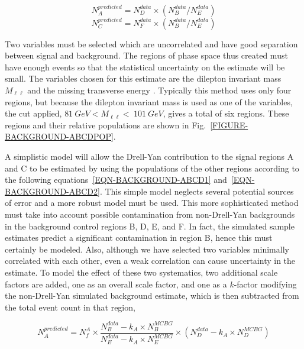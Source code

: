 \begin{equation}
\label{EQN-BACKGROUND-ABCD1}
N_{A}^{predicted} = N_{D}^{data} \times (N_{B}^{data}/N_{E}^{data})
\end{equation} 
\begin{equation}
\label{EQN-BACKGROUND-ABCD2}
N_{C}^{predicted} = N_{F}^{data} \times (N_{B}^{data}/N_{E}^{data})
\end{equation} 

Two variables must be selected which are uncorrelated and have good separation between signal and background. The regions of phase space thus created must have enough events so that the statistical uncertainty on the estimate will be small. The variables chosen for this estimate are the dilepton invariant mass $M_{\ell\ell}$ and the missing transverse energy \MET. Typically this method uses only four regions, but because the dilepton invariant mass is used as one of the variables, the cut applied, $81\ GeV < M_{\ell\ell} <\ 101\ GeV$, gives a total of six regions. These regions and their relative populations are shown in Fig.~\ref{FIGURE-BACKGROUND-ABCDPOP}.

A simplistic model will allow the Drell-Yan contribution to the signal regions A and C to be estimated by using the populations of the other regions according to the following equations~\ref{EQN-BACKGROUND-ABCD1} and~\ref{EQN-BACKGROUND-ABCD2}. This simple model neglects several potential sources of error and a more robust model must be used. This more sophisticated method must take into account possible contamination from non-Drell-Yan backgrounds in the background control regions B, D, E, and F. In fact, the simulated sample estimates predict a significant contamination in region B, hence this must certainly be modeled. Also, although we have selected two variables minimally correlated with each other, even a weak correlation can cause uncertainty in the estimate. To model the effect of these two systematics, two additional scale factors are added, one as an overall scale factor, and one as a $k$-factor modifying the non-Drell-Yan simulated background estimate, which is then subtracted from the total event count in that region,

\begin{equation}
N_{A}^{predicted} = N_{f}^{A} \times \frac{N_{B}^{data}-k_{A}\times N_{B}^{MCBG}}{N_{E}^{data}-k_{A}\times N_{E}^{MCBG}} \times (N_{D}^{data}-k_{A}\times N_{D}^{MCBG})
\end{equation} 

